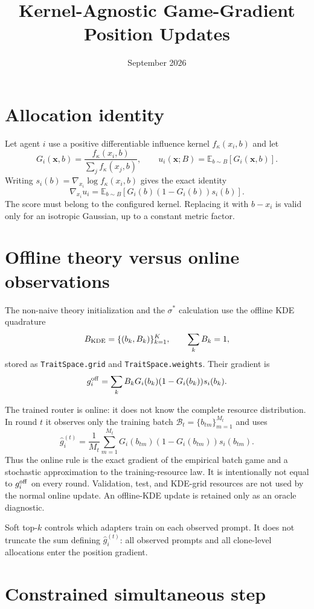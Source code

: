 \documentclass[11pt]{article}
\title{Kernel-Agnostic Game-Gradient Position Updates}
\date{September 2026}
\newcommand{\E}{\mathbb{E}}
\newcommand{\bx}{\mathbf{x}}
\newcommand{\cfg}[1]{\texttt{#1}}
\begin{document}
\maketitle

\section{Allocation identity}

Let agent $i$ use a positive differentiable influence kernel
$f_\kappa(x_i,b)$ and let
\[
G_i(\bx,b)=\frac{f_\kappa(x_i,b)}{\sum_j f_\kappa(x_j,b)},
\qquad
u_i(\bx;B)=\E_{b\sim B}[G_i(\bx,b)].
\]
Writing $s_i(b)=\nabla_{x_i}\log f_\kappa(x_i,b)$ gives the exact identity
\[
\nabla_{x_i}u_i
=\E_{b\sim B}\!\left[G_i(b)(1-G_i(b))s_i(b)\right].
\]
The score must belong to the configured kernel.  Replacing it with $b-x_i$
is valid only for an isotropic Gaussian, up to a constant metric factor.

\section{Offline theory versus online observations}

The non-naive theory initialization and the $\sigma^*$ calculation use the
offline KDE quadrature
\[
B_{\rm KDE}=\{(b_k,B_k)\}_{k=1}^{K},\qquad \sum_k B_k=1,
\]
stored as \cfg{TraitSpace.grid} and \cfg{TraitSpace.weights}.  Their gradient
is
\[
g_i^{\rm off}=\sum_k B_kG_i(b_k)(1-G_i(b_k))s_i(b_k).
\]

The trained router is online: it does not know the complete resource
distribution.  In round $t$ it observes only the training batch
$\mathcal B_t=\{b_{tm}\}_{m=1}^{M_t}$ and uses
\[
\widehat g_i^{(t)}=
\frac{1}{M_t}\sum_{m=1}^{M_t}
G_i(b_{tm})(1-G_i(b_{tm}))s_i(b_{tm}).
\]
Thus the online rule is the exact gradient of the empirical batch game and a
stochastic approximation to the training-resource law.  It is intentionally
not equal to $g_i^{\rm off}$ on every round.  Validation, test, and KDE-grid
resources are not used by the normal online update.  An offline-KDE update is
retained only as an oracle diagnostic.

Soft top-$k$ controls which adapters train on each observed prompt.  It does
not truncate the sum defining $\widehat g_i^{(t)}$: all observed prompts and
all clone-level allocations enter the position gradient.

\section{Constrained simultaneous step}
\end{document}
